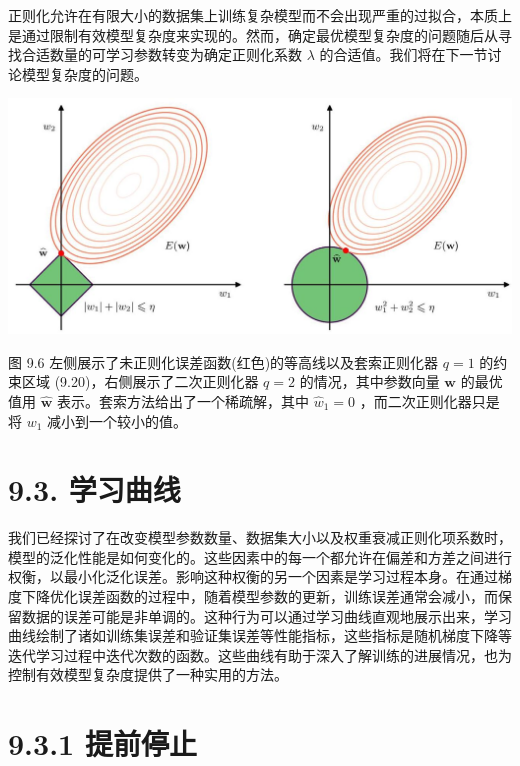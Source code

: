 \documentclass[10pt]{report}
\begin{document}
正则化允许在有限大小的数据集上训练复杂模型而不会出现严重的过拟合，本质上是通过限制有效模型复杂度来实现的。然而，确定最优模型复杂度的问题随后从寻找合适数量的可学习参数转变为确定正则化系数 \(\lambda\) 的合适值。我们将在下一节讨论模型复杂度的问题。

\begin{center}
\includegraphics[max width=1.0\textwidth]{images/0194e279-9b28-703a-88f4-c3ac21e2010d_285_237_341_1308_613_0.jpg}
\end{center}
\hspace*{3em} 

图 9.6 左侧展示了未正则化误差函数(红色)的等高线以及套索正则化器 \(q = 1\) 的约束区域 (9.20)，右侧展示了二次正则化器 \(q = 2\) 的情况，其中参数向量 \(\mathbf{w}\) 的最优值用 \(\widehat{\mathbf{w}}\) 表示。套索方法给出了一个稀疏解，其中 \({\widehat{w}}_{1} = 0\) ，而二次正则化器只是将 \({w}_{1}\) 减小到一个较小的值。

\section*{9.3. 学习曲线}

我们已经探讨了在改变模型参数数量、数据集大小以及权重衰减正则化项系数时，模型的泛化性能是如何变化的。这些因素中的每一个都允许在偏差和方差之间进行权衡，以最小化泛化误差。影响这种权衡的另一个因素是学习过程本身。在通过梯度下降优化误差函数的过程中，随着模型参数的更新，训练误差通常会减小，而保留数据的误差可能是非单调的。这种行为可以通过学习曲线直观地展示出来，学习曲线绘制了诸如训练集误差和验证集误差等性能指标，这些指标是随机梯度下降等迭代学习过程中迭代次数的函数。这些曲线有助于深入了解训练的进展情况，也为控制有效模型复杂度提供了一种实用的方法。

\section*{9.3.1 提前停止}
\end{document}
